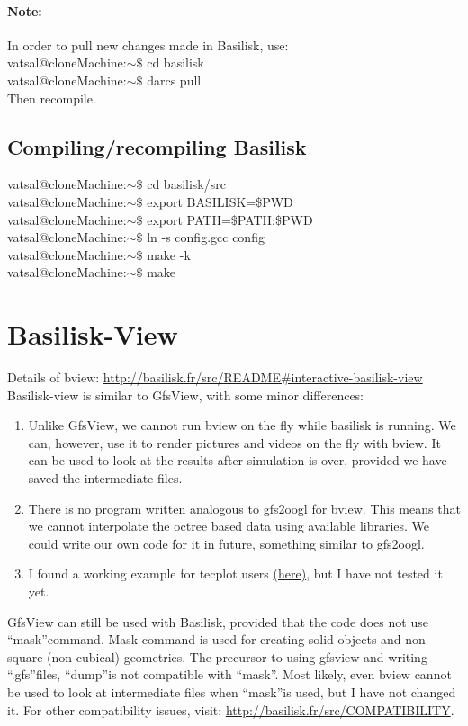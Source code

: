 \documentclass[]{article}
\newcommand\Colorhref[3][blue]{\href{#2}{\color{#1}#3}}
\begin{document}
\paragraph{\textbf{Note:}} In order to pull new changes made in Basilisk, use:\\
{\color{red}vatsal@cloneMachine:$\sim\$$} cd basilisk\\
{\color{red}vatsal@cloneMachine:$\sim\$$} darcs pull\\
Then recompile.
\subsection{Compiling/recompiling Basilisk}
{\color{red}vatsal@cloneMachine:$\sim\$$} cd basilisk/src\\
{\color{red}vatsal@cloneMachine:$\sim\$$} export BASILISK=\$PWD\\
{\color{red}vatsal@cloneMachine:$\sim\$$} export PATH=\$PATH:\$PWD\\
{\color{red}vatsal@cloneMachine:$\sim\$$} ln -s config.gcc config\\
{\color{red}vatsal@cloneMachine:$\sim\$$} make -k\\
{\color{red}vatsal@cloneMachine:$\sim\$$} make

\section{Basilisk-View}
Details of bview: \Colorhref{http://basilisk.fr/src/README\#interactive-basilisk-view}{http://basilisk.fr/src/README\#interactive-basilisk-view}\\
Basilisk-view is similar to GfsView, with some minor differences:
\begin{enumerate}
\item Unlike GfsView, we cannot run bview on the fly while basilisk is running. We can, however, use it to render pictures and videos on the fly with bview. It can be used to look at the results after simulation is over, provided we have saved the intermediate files.
\item There is no program written analogous to gfs2oogl for bview. This means that we cannot interpolate the octree based data using available libraries. We could write our own code for it in future, something similar to gfs2oogl.
\item I found a working example for tecplot users \Colorhref{http://basilisk.fr/sandbox/hiroumi/tecplot/}{(here)}, but I have not tested it yet. 
\end{enumerate}
GfsView can still be used with Basilisk, provided that the code does not use \textquotedblleft mask\textquotedblright command. Mask command is used for creating solid objects and non-square (non-cubical) geometries. The precursor to using gfsview and writing \textquotedblleft.gfs\textquotedblright files, \textquotedblleft dump\textquotedblright is not compatible with \textquotedblleft mask\textquotedblright. Most likely, even bview cannot be used to look at intermediate files when \textquotedblleft mask\textquotedblright is used, but I have not changed it. For other compatibility issues, visit: \Colorhref{http://basilisk.fr/src/COMPATIBILITY}{http://basilisk.fr/src/COMPATIBILITY}.
\end{document}
